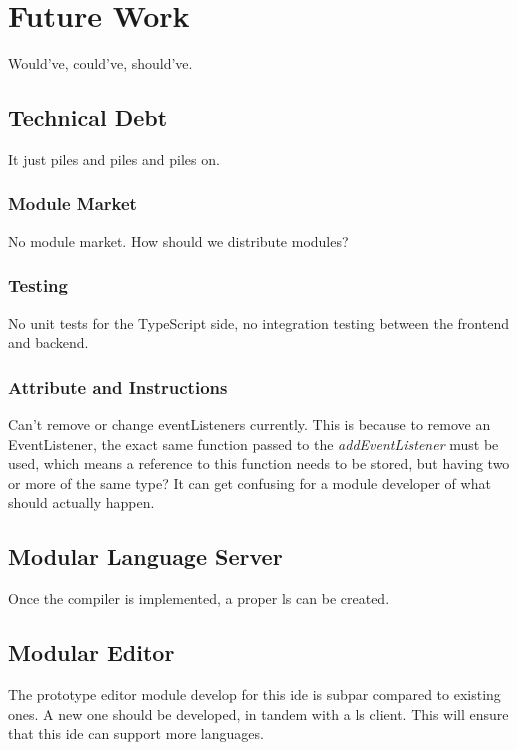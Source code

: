 \chapter{Future Work}

Would've, could've, should've.


\section{Technical Debt}

It just piles and piles and piles on.

\subsection{Module Market}

No module market. How should we distribute modules?

\subsection{Testing}

No unit tests for the TypeScript side, no integration testing between the
frontend and backend.

\subsection{Attribute and Instructions}

Can't remove or change eventListeners currently. This is because to remove an
EventListener, the exact same function passed to the \textit{addEventListener}
must be used, which means a reference to this function needs to be stored, but
having two or more of the same type? It can get confusing for a module developer
of what should actually happen.

\section{Modular Language Server}

Once the compiler \cite{wiig} is implemented, a proper \gls{ls} can be created.

\section{Modular Editor}

The prototype editor module develop for this \gls{ide} is subpar compared to
existing ones. A new one should be developed, in tandem with a \gls{ls} client.
This will ensure that this \gls{ide} can support more languages.
